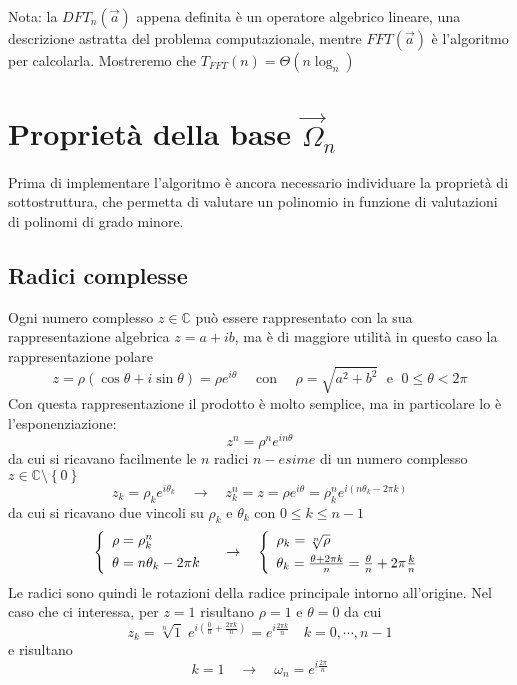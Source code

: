 Nota: la $DFT_n\left( \vec{a} \right) $ appena definita è un operatore algebrico lineare, una descrizione astratta del problema computazionale, mentre $FFT \left( \vec{a} \right)$ è l'algoritmo per calcolarla. Mostreremo che $T_{FFT} \left( n \right) = \Theta \left( n \log_n \right)$

\section{Proprietà della base $\vec{\Omega}_n$}
Prima di implementare l'algoritmo è ancora necessario individuare la proprietà di sottostruttura, che permetta di valutare un polinomio in funzione di valutazioni di polinomi di grado minore.

\subsection{Radici complesse}
Ogni numero complesso $z \in \mathbb{C}$ può essere rappresentato con la sua rappresentazione algebrica $z = a+ib$, ma è di maggiore utilità in questo caso la rappresentazione polare
\begin{equation*}
    z = \rho \left( \cos \theta + i \sin \theta \right) = \rho e ^{i \theta} \quad
    \text{ con } \quad \rho = \sqrt{a^2+b^2} \; \text{ e } \; 0 \leq \theta < 2\pi
\end{equation*}
Con questa rappresentazione il prodotto è molto semplice, ma in particolare lo è l'esponenziazione:
\begin{equation*}
    z^n = \rho^n e^{in\theta}
\end{equation*}
da cui si ricavano facilmente le $n$ radici $n-esime$ di un numero complesso $z \in \mathbb{C} \setminus \left\{ 0 \right\}$
\begin{equation*}
    z_k = \rho_k e^{i \theta_k}
    \quad \rightarrow \quad 
    z_k^n = z = \rho e^{i\theta} = \rho_k^n e ^{i \left( n \theta_k - 2 \pi k \right)}
\end{equation*}
da cui si ricavano due vincoli su $\rho_k $ e $ \theta_k$ con $0 \leq k \leq n-1$
\[
    \left\{
        \begin{array}[h]{l}
            \rho = \rho_k^n \\[4pt]
            \theta = n \theta_k - 2 \pi k
        \end{array}
    \right.
    \quad \rightarrow \quad 
    \left\{
        \begin{array}[h]{l}
            \rho_k = \sqrt[n]{\rho} \\[4pt]
            \theta_k = \frac{\theta + 2 \pi k}{n} = \frac{\theta}{n} + 2 \pi \frac{k}{n}
        \end{array}
    \right.
\]
Le radici sono quindi le rotazioni della radice principale intorno all'origine. Nel caso che ci interessa, per $z=1$ risultano $\rho=1$ e $\theta = 0$ da cui
\begin{equation*}
    z_k = \sqrt[n]{1}  \; e^{i \left( \frac{0}{n} + \frac{2 \pi k}{n} \right)} 
    = e ^{i \frac{2 \pi k }{n}} \quad k=0,\cdots,n-1
\end{equation*}
e risultano
\begin{equation*}
    k=1 \quad \rightarrow \quad \omega_n= e^{i \frac{2 \pi}{n}}
\end{equation*}

